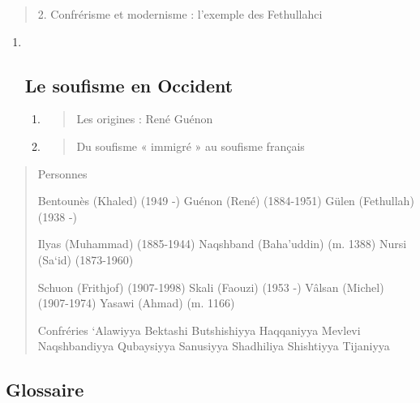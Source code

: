 \begin{quote}
2. Confrérisme et modernisme : l'exemple des Fethullahci
\end{quote}

\begin{enumerate}
\def\labelenumi{\Roman{enumi}.}
\setcounter{enumi}{3}
\item ~
  \hypertarget{le-soufisme-en-occident}{%
  \subsection{\texorpdfstring{{Le soufisme en
  Occident}}{Le soufisme en Occident}}\label{le-soufisme-en-occident}}

  \begin{enumerate}
  \def\labelenumii{\arabic{enumii}.}
  \item
    \begin{quote}
    Les origines : René Guénon
    \end{quote}
  \item
    \begin{quote}
    Du soufisme « immigré » au soufisme français
    \end{quote}
  \end{enumerate}
\end{enumerate}

\begin{quote}
{Personnes}

Bentounès (Khaled) (1949 -) Guénon (René) (1884-1951) Gülen (Fethullah)
(1938 -)

Ilyas (Muhammad) (1885-1944) Naqshband (Baha'uddin) (m. 1388) Nursi
(Sa`id) (1873-1960)

Schuon (Frithjof) (1907-1998) Skali (Faouzi) (1953 -) Vâlsan (Michel)
(1907-1974) Yasawi (Ahmad) (m. 1166)

{Confréries} `Alawiyya Bektashi Butshishiyya Haqqaniyya
Mevlevi Naqshbandiyya Qubaysiyya Sanusiyya Shadhiliya Shishtiyya
Tijaniyya
\end{quote}

\hypertarget{glossaire-8}{%
\subsection{\texorpdfstring{\hfill\break
{Glossaire}}{ Glossaire}}\label{glossaire-8}}

